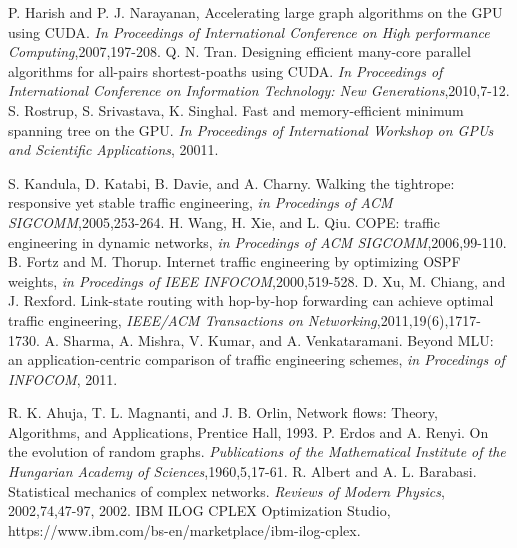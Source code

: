 \documentclass[master]{thesis-uestc}
\begin{document}
\begin{thebibliography}{1}
P. Harish and P. J. Narayanan, Accelerating large graph algorithms on the GPU using CUDA. \emph{In Proceedings of International Conference on High performance Computing},2007,197-208.
Q. N. Tran. Designing efficient many-core parallel algorithms for all-pairs shortest-poaths using CUDA. \emph{In Proceedings of International Conference on Information Technology: New Generations},2010,7-12.
S. Rostrup, S. Srivastava, K. Singhal. Fast and memory-efficient minimum spanning tree on the GPU. \emph{In Proceedings of International Workshop on GPUs and Scientific Applications}, 20011.


S. Kandula, D. Katabi, B. Davie, and A. Charny. Walking the tightrope: responsive yet stable traffic engineering, \emph{in Procedings of ACM SIGCOMM},2005,253-264.
H. Wang, H. Xie, and L. Qiu. COPE: traffic engineering in dynamic networks, \emph{in Procedings of ACM SIGCOMM},2006,99-110.
B. Fortz and M. Thorup. Internet traffic engineering by optimizing OSPF weights, \emph{in Procedings of IEEE INFOCOM},2000,519-528.
D. Xu, M. Chiang, and J. Rexford. Link-state routing with hop-by-hop forwarding can achieve optimal traffic engineering, \emph{IEEE/ACM Transactions on Networking},2011,19(6),1717-1730.
A. Sharma, A. Mishra, V. Kumar, and A. Venkataramani. Beyond MLU: an application-centric comparison of traffic engineering schemes, \emph{in Procedings of INFOCOM}, 2011.

R. K. Ahuja, T. L. Magnanti, and J. B. Orlin, Network flows: Theory, Algorithms, and Applications, Prentice Hall, 1993.
P. Erdos and A. Renyi. On the evolution of random graphs. \emph{Publications of the Mathematical Institute of the Hungarian Academy of
Sciences},1960,5,17-61.
R. Albert and A. L. Barabasi. Statistical mechanics of complex networks. \emph{Reviews of Modern Physics}, 2002,74,47-97, 2002.
IBM ILOG CPLEX Optimization Studio, https://www.ibm.com/bs-en/marketplace/ibm-ilog-cplex.


\end{thebibliography}
\end{document}
